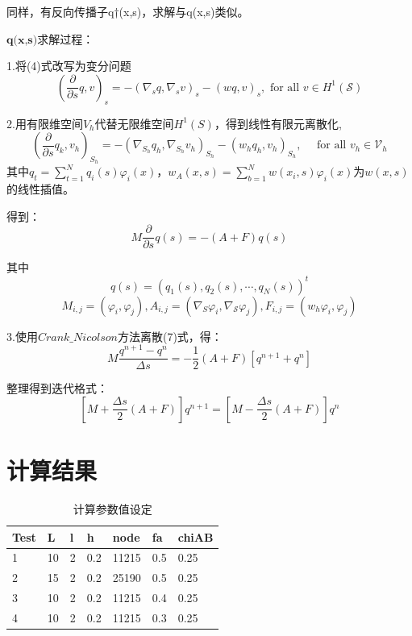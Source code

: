 \documentclass[12pt,a4paper]{article}
\begin{document}
同样，有反向传播子q†(x,s)，求解与q(x,s)类似。

$\textbf{q(x,s)求解过程：}$

1.将(4)式改写为变分问题
\begin{equation}
\left(\frac{\partial}{\partial s} q, v\right)_{s}=-\left(\nabla_{s} q, \nabla_{s} v\right)_{s}-(w q, v)_{s}, \text { for all } v \in H^{1}(\mathcal{S})
\end{equation}

2.用有限维空间$V_h$代替无限维空间$H^1(S)$，得到线性有限元离散化,
\begin{equation}
\left(\frac{\partial}{\partial s} q_{k}, v_{h}\right)_{S_{h}}=-\left(\nabla_{S_{h}} q_{h}, \nabla_{S_{h}} v_{h}\right)_{S_{h}}-\left(w_{h} q_{h}, v_{h}\right)_{S_{h}}, \quad \text { for all } v_{h} \in \mathcal{V}_{h}
\end{equation}
其中$q_{t}=\sum_{t=1}^{N} q_{i}(s) \varphi_{i}(x)$，$w_{A}(x, s)=\sum_{b=1}^{N} w\left(x_{i}, s\right) \varphi_{i}(x)$为$w(x,s)$的线性插值。

得到：
\begin{equation}
M \frac{\partial}{\partial s} q(s)=-(A+F) q(s)
\end{equation}

其中
\begin{equation*}
q(s)=\left(q_{1}(s), q_{2}(s), \cdots, q_{N}(s)\right)^{t}
\end{equation*}
$$
M_{i, j}=\left(\varphi_{i}, \varphi_{j}\right), A_{i, j}=\left(\nabla_{S} \varphi_{i}, \nabla_{\mathcal{S}} \varphi_{j}\right), F_{i, j}=\left(w_{h} \varphi_{i}, \varphi_{j}\right)
$$

3.使用$Crank\_Nicolson$方法离散(7)式，得：
\begin{equation}
M \frac{q^{n+1}-q^{n}}{\Delta s}=-\frac{1}{2}(A+F)\left[q^{n+1}+q^{n}\right]
\end{equation}

整理得到迭代格式：
\begin{equation}
\left[M+\frac{\Delta s}{2}(A+F)\right] q^{n+1}=\left[M-\frac{\Delta s}{2}(A+F)\right] q^{n}
\end{equation}

\newpage
\section{计算结果}

\begin{table}[h]
	\centering     %
	\caption{计算参数值设定}  
	\begin{tabular*}{10cm}{lllllll}  
		\hline  
		Test &L  & l  & h   & node  & fa  & chiAB\\  
		\hline  
		1    &10 & 2  & 0.2 & 11215 & 0.5 & 0.25 \\  
		2    &15 & 2  & 0.2 & 25190 & 0.5 & 0.25 \\
		3    &10 & 2  & 0.2 & 11215 & 0.4 & 0.25 \\
		4    &10 & 2  & 0.2 & 11215 & 0.3 & 0.25 \\ 
		\hline  
	\end{tabular*}  
\end{table}  
\end{document}
